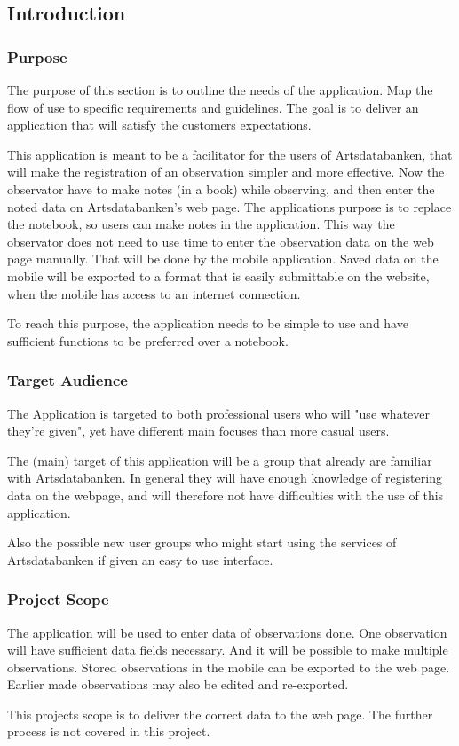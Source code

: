 \subsection{Introduction}
\subsubsection{Purpose}
	The purpose of this section is to outline the needs of the application. Map the flow of use to specific requirements and guidelines. The goal is to deliver an application that will satisfy the customers expectations.  

This application is meant to be a facilitator for the users of Artsdatabanken, that will make the registration of an observation simpler and more effective. Now the observator have to make notes (in a book) while observing, and then enter the noted data on Artsdatabanken's web page. The applications purpose is to replace the notebook, so users can make notes in the application. This way the observator does not need to use time to enter the observation data on the web page manually. That will be done by the mobile application. Saved data on the mobile will be exported to a format that is easily submittable on the website, when the mobile has access to an internet connection.

To reach this purpose, the application needs to be simple to use and have sufficient functions to be preferred over a notebook. 



\subsubsection{Target Audience}
	The Application is targeted to both professional users who will "use whatever they're given", yet have different main focuses than more casual users.

	The (main) target of this application will be a group that already are familiar with Artsdatabanken. In general they will have enough knowledge of registering data on the webpage, and will therefore not have difficulties with the use of this application. 

	Also the possible new user groups who might start using the services of Artsdatabanken if given an easy to use interface.


\subsubsection{Project Scope}
The application will be used to enter data of observations done. One observation will have sufficient data fields necessary. And it will be possible to make multiple observations. Stored observations in the mobile can be exported to the web page. Earlier made observations may also be edited and re-exported.

	This projects scope is to deliver the correct data to the web page. The further process is not covered in this project.
